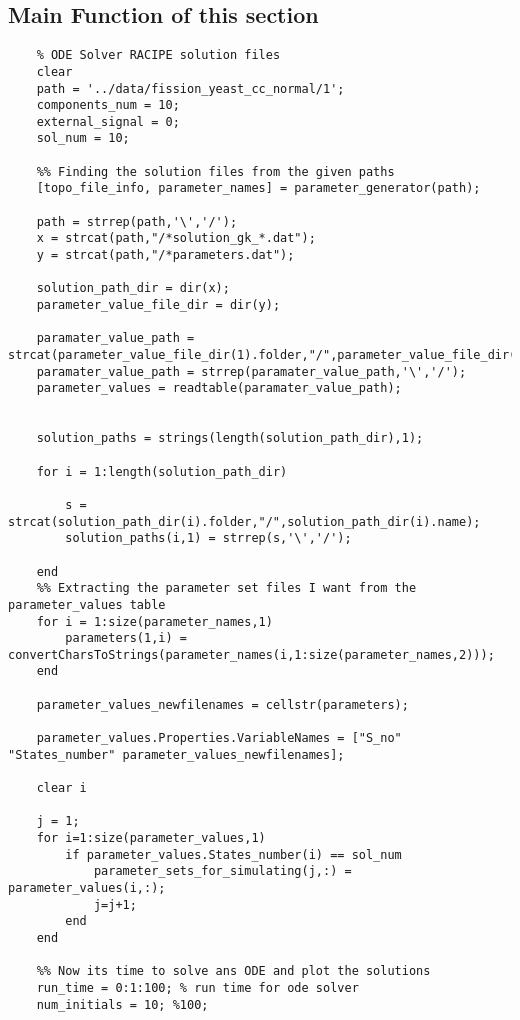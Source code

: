 \documentclass{article}
\begin{document}
\subsection*{Main Function of this section}
\begin{verbatim}
    % ODE Solver RACIPE solution files 
    clear
    path = '../data/fission_yeast_cc_normal/1';
    components_num = 10;
    external_signal = 0;
    sol_num = 10;
    
    %% Finding the solution files from the given paths
    [topo_file_info, parameter_names] = parameter_generator(path);
    
    path = strrep(path,'\','/');
    x = strcat(path,"/*solution_gk_*.dat");
    y = strcat(path,"/*parameters.dat");
    
    solution_path_dir = dir(x);
    parameter_value_file_dir = dir(y);
    
    paramater_value_path = strcat(parameter_value_file_dir(1).folder,"/",parameter_value_file_dir(1).name);
    paramater_value_path = strrep(paramater_value_path,'\','/');
    parameter_values = readtable(paramater_value_path);
    
    
    solution_paths = strings(length(solution_path_dir),1);
    
    for i = 1:length(solution_path_dir)
        
        s = strcat(solution_path_dir(i).folder,"/",solution_path_dir(i).name);
        solution_paths(i,1) = strrep(s,'\','/');
        
    end
    %% Extracting the parameter set files I want from the parameter_values table 
    for i = 1:size(parameter_names,1)
        parameters(1,i) = convertCharsToStrings(parameter_names(i,1:size(parameter_names,2)));
    end
    
    parameter_values_newfilenames = cellstr(parameters);
    
    parameter_values.Properties.VariableNames = ["S_no" "States_number" parameter_values_newfilenames];
    
    clear i
    
    j = 1;
    for i=1:size(parameter_values,1)
        if parameter_values.States_number(i) == sol_num
            parameter_sets_for_simulating(j,:) = parameter_values(i,:);
            j=j+1;
        end
    end
    
    %% Now its time to solve ans ODE and plot the solutions 
    run_time = 0:1:100; % run time for ode solver
    num_initials = 10; %100;
    

\end{verbatim}
\end{document}
